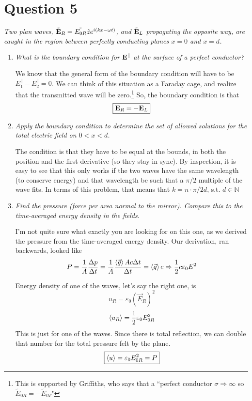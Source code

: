 \documentclass[12pt]{article}
\begin{document}
\section*{Question 5}
{\sl Two plan waves, $\tilde{\vb{E}}_R = \tilde{E_{0R}}\hat{z}e^{i(kx-\omega t)}$, and $\tilde{\vb{E}}_L$ propagating the opposite way, are caught in the region between perfectly conducting planes $x=0$ and $x=d$.}

\begin{enumerate}[label=\alph*)]
\item {\sl What is the boundary condition for $\vb{E}^\parallel$ at the surface of a perfect conductor?}

We know that the general form of the boundary condition will have to be $E_1^\parallel - E_2^\parallel = 0$. We can think of this situation as a Faraday cage, and realize that the transmitted wave will be zero.\footnote{This is supported by Griffiths, who says that a ``perfect conductor $\sigma \Rightarrow \infty$ so $\tilde{E}_{0R} = - \tilde{E}_{0T}$"} So, the boundary condition is that
\[\boxed{\vb{E}_R = -\vb{E}_L}\]

\item {\sl Apply the boundary condition to determine the set of allowed solutions for the total electric field on $0<x<d$.}

The condition is that they have to be equal at the bounds, in both the position and the first derivative (so they stay in sync). By inspection, it is easy to see that this only works if the two waves have the same wavelength (to conserve energy) and that wavelength be such that a $\pi/2$ multiple of the wave fits. In terms of this problem, that means that $k = n \cdot \pi/2 d$, s.t. $d \in \mathbb{N}$

\item {\sl Find the pressure (force per area normal to the mirror). Compare this to the time-averaged energy density in the fields.}

I'm not quite sure what exactly you are looking for on this one, as we derived the pressure from the time-averaged energy density. Our derivation, ran backwards, looked like
\[P = \frac{1}{A}\frac{\Delta p}{\Delta t} =\frac{1}{A} \frac{\ev{\vec{g}}A c \Delta t}{\Delta t} = \ev{\vec{g}}c \Rightarrow \frac{1}{2} c \varepsilon_0 E^2\]

Energy density of one of the waves, let's say the right one, is
\[u_R = \varepsilon_0 (\vec{E}_{R})^2\]
\[\ev{u_R} = \frac{1}{2} \varepsilon_0 E_{0R}^2\]
This is just for one of the waves. Since there is total reflection, we can double that number for the total pressure felt by the plane.
\[\boxed{\ev{u} = \varepsilon_0 E_{0R}^2 = P}\]


\end{enumerate}
\end{document}

